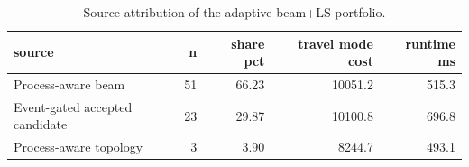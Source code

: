 \begin{table}[t]
\centering
\caption{Source attribution of the adaptive beam+LS portfolio.}
\label{tab:portfolio-selection-summary}
\begin{tabular}{lrrrr}
\toprule
source & n & share pct & travel mode cost & runtime ms \\
\midrule
Process-aware beam & 51 & 66.23 & 10051.2 & 515.3 \\
Event-gated accepted candidate & 23 & 29.87 & 10100.8 & 696.8 \\
Process-aware topology & 3 & 3.90 & 8244.7 & 493.1 \\
\bottomrule
\end{tabular}
\end{table}
